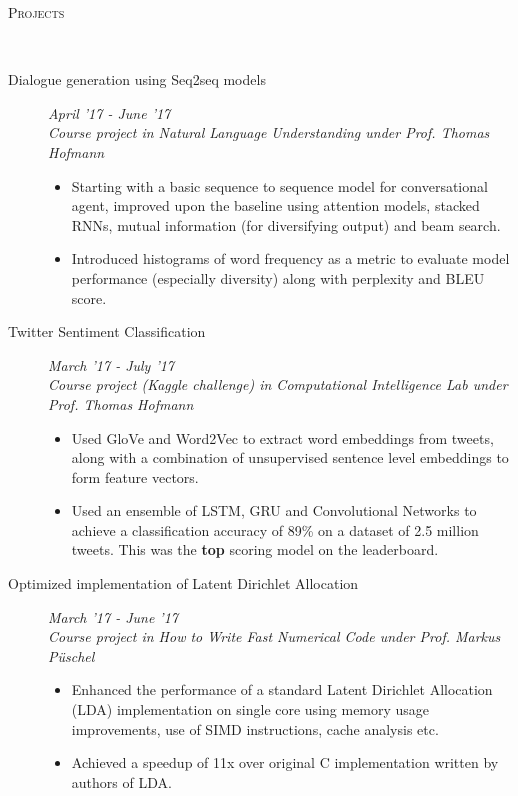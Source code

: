 \documentclass[9pt]{article}
\newenvironment{changemargin}[2]{%
  \begin{list}{}{%
      \setlength{\topsep}{0pt}%
    \setlength{\leftmargin}{#1}%
    \setlength{\rightmargin}{#2}%
    \setlength{\listparindent}{\parindent}%
  \setlength{\itemindent}{\parindent}%
    \setlength{\parsep}{\parskip}%
    }%
  \item[]}{\end{list}
    }
\newcommand{\lineover}{
  \begin{changemargin}{-0.05in}{-0.10in}
    \vspace*{-9pt}
    \hrulefill \\
    \vspace*{-2pt}
  \end{changemargin}
}
\newcommand{\header}[1]{
  \begin{changemargin}{-0.5in}{-0.5in}
    \scshape{#1}\\
        \lineover
  \end{changemargin}
}
\newenvironment{body} {
  \vspace*{-16pt}
        \begin{changemargin}{-0.6in}{-0.65in}
        }	
        {\end{changemargin}
}
\begin{document}
\header{Projects}
\begin{body}
  \vspace{14pt}

  \begin{description}
    \item[\normalsize{Dialogue generation using Seq2seq models}] \hfill \textit{April '17 - June '17} \\
      \textit{Course project in Natural Language Understanding under Prof. Thomas Hofmann}
      \begin{itemize}
        \item Starting with a basic sequence to sequence model for conversational
          agent, improved upon the baseline using attention models, stacked RNNs,
          mutual information (for diversifying output) and beam search.
        \item Introduced histograms of word frequency as a metric to evaluate 
          model performance (especially diversity) along with perplexity and BLEU 
          score.
      \end{itemize}

    \item[\normalsize{Twitter Sentiment Classification}] \hfill \textit{March '17 - July '17} \\
      \textit{Course project (Kaggle challenge) in Computational Intelligence Lab
      under Prof. Thomas Hofmann}
      \begin{itemize}
        \item Used GloVe and Word2Vec to extract word embeddings from tweets, 
          along with a combination of unsupervised sentence level embeddings to
          form feature vectors.
        \item Used an ensemble of LSTM, GRU and Convolutional Networks
          to achieve a classification accuracy of 89\% on a dataset of 2.5 million
          tweets. This was the {\bf top} scoring model on the leaderboard. 
      \end{itemize}

    \item[\normalsize{Optimized implementation of Latent Dirichlet Allocation}]  \hfill \textit{March '17 - June '17} \\
      \textit{Course project in How to Write Fast Numerical Code under Prof. Markus P{\"u}schel}
      \begin{itemize}
        \item Enhanced the performance of a standard Latent Dirichlet Allocation (LDA)
          implementation on single core using memory usage improvements, use of 
          SIMD instructions, cache analysis etc.
        \item Achieved a speedup of 11x over original C implementation written by authors
          of LDA.
      \end{itemize}


\end{description}
\end{body}
\end{document}

